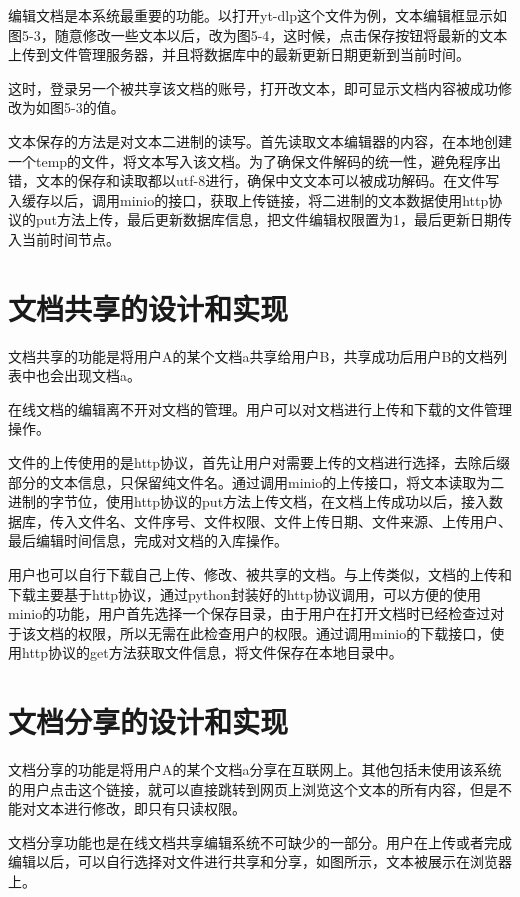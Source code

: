 \documentclass[forprint]{software}
\begin{document}
编辑文档是本系统最重要的功能。以打开yt-dlp这个文件为例，文本编辑框显示如图5-3，随意修改一些文本以后，改为图5-4，这时候，点击保存按钮将最新的文本上传到文件管理服务器，并且将数据库中的最新更新日期更新到当前时间。

这时，登录另一个被共享该文档的账号，打开改文本，即可显示文档内容被成功修改为如图5-3的值。

文本保存的方法是对文本二进制的读写。首先读取文本编辑器的内容，在本地创建一个temp的文件，将文本写入该文档。为了确保文件解码的统一性，避免程序出错，文本的保存和读取都以utf-8进行，确保中文文本可以被成功解码。在文件写入缓存以后，调用minio的接口，获取上传链接，将二进制的文本数据使用http协议的put方法上传，最后更新数据库信息，把文件编辑权限置为1，最后更新日期传入当前时间节点。

\section{文档共享的设计和实现}

文档共享的功能是将用户A的某个文档a共享给用户B，共享成功后用户B的文档列表中也会出现文档a。

在线文档的编辑离不开对文档的管理。用户可以对文档进行上传和下载的文件管理操作。

文件的上传使用的是http协议，首先让用户对需要上传的文档进行选择，去除后缀部分的文本信息，只保留纯文件名。通过调用minio的上传接口，将文本读取为二进制的字节位，使用http协议的put方法上传文档，在文档上传成功以后，接入数据库，传入文件名、文件序号、文件权限、文件上传日期、文件来源、上传用户、最后编辑时间信息，完成对文档的入库操作。

用户也可以自行下载自己上传、修改、被共享的文档。与上传类似，文档的上传和下载主要基于http协议，通过python封装好的http协议调用，可以方便的使用minio的功能，用户首先选择一个保存目录，由于用户在打开文档时已经检查过对于该文档的权限，所以无需在此检查用户的权限。通过调用minio的下载接口，使用http协议的get方法获取文件信息，将文件保存在本地目录中。

\section{文档分享的设计和实现}

文档分享的功能是将用户A的某个文档a分享在互联网上。其他包括未使用该系统的用户点击这个链接，就可以直接跳转到网页上浏览这个文本的所有内容，但是不能对文本进行修改，即只有只读权限。

文档分享功能也是在线文档共享编辑系统不可缺少的一部分。用户在上传或者完成编辑以后，可以自行选择对文件进行共享和分享，如图所示，文本被展示在浏览器上。
\end{document}
